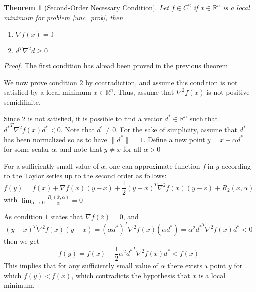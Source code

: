 \documentclass{book}
\newcommand{\R}{\mathbb{R}}
\theoremstyle{theoremv2}
\newtheorem{theorem}{Theorem}[chapter]
\theoremstyle{defv2}
\theoremstyle{remark}
\theoremstyle{remark}
\begin{document}
\begin{theorem}[Second-Order Necessary Condition]
    Let $f\in C^2$ if $\bar{x}\in\R^n$ is a local minimum for problem \eqref{unc_prob}, then 
    \begin{enumerate}
        \item $\nabla f(\bar{x})=0$ 
        \item $d^T \nabla^2 d \geq 0 $
    \end{enumerate}
\end{theorem}
\begin{proof}
    The first condition has alread been proved in the previous theorem 

    We now prove condition $2$ by contradiction, and assume this condition is not satisfied by a local minimum $\bar{x}\in\R^n$. Thus, assume that $\nabla^2 f(\bar{x})$ is not positive semidifinite. 

    Since $2$ is not satisfied, it is possible to find a vector $d^*\in\R^n$ such that ${d^*}^T\nabla^2 f(\bar{x})d^* < 0$. Note that $d^*\neq0$. For the sake of simplicity, assume that $d^*$ has been normalized so as to have $\|d^*\|=1$. Define a new point $y=\bar{x}+\alpha d^*$ for some scalar $\alpha$, and note that $y\neq \bar{x}$ for all $\alpha>0$

    For a sufficiently small value of $\alpha$, one can approximate function $f$ in $y$ according to the Taylor series up to the second order as follows: 
    \[
        f(y) = f(\bar{x}) + \nabla f(\bar{x})(y-\bar{x})+\frac{1}{2}(y-\bar{x})^T \nabla^2 f(\bar{x})(y-\bar{x}) + R_2(\bar{x},\alpha)
    \]
    with $\lim_{\alpha\to 0} \displaystyle\frac{R_2(\bar{x},\alpha)}{\alpha}=0$

    As condition $1$ states that $\nabla f(\bar{x})=0$, and
    \[
        (y-\bar{x})^T\nabla^2 f(\bar{x})(y-\bar{x}) = (\alpha d^*)^T \nabla^2 f(\bar{x}) (\alpha d^*) = \alpha^2 {d^*}^T \nabla^2 f(\bar{x}) d^* < 0
    \]
    then we get 
    \[
        f(y) = f(\bar{x}) + \frac{1}{2}  \alpha^2 {d^*}^T \nabla^2 f(\bar{x}) d^* < f(\bar{x})
    \]
    This implies that for any sufficiently small value of $\alpha$ there exists a point $y$ for which $f(y)<f(\bar{x})$, which contradicts the hypothesis that $\bar{x}$ is a local minimum.
\end{proof}
\end{document}
